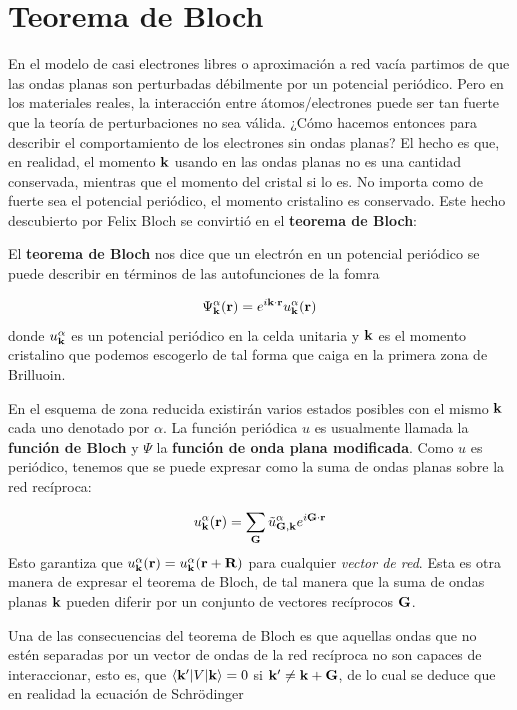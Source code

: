 \section{Teorema de Bloch}

En el modelo de casi electrones libres o aproximación a red vacía partimos de que las ondas planas son perturbadas débilmente por un potencial periódico. Pero en los materiales reales, la interacción entre átomos/electrones puede ser tan fuerte que la teoría de perturbaciones no sea válida. ¿Cómo hacemos entonces para describir el comportamiento de los electrones sin ondas planas? El hecho es que, en realidad, el momento $\mathbf{k}$ usando en las ondas planas no es una cantidad conservada, mientras que el momento del cristal si lo es. No importa como de fuerte sea el potencial periódico, el momento cristalino es conservado. Este hecho descubierto por Felix Bloch se convirtió en el \textbf{teorema de Bloch}:

\begin{mybox}
	El \textbf{teorema de Bloch} nos dice que un electrón en un potencial periódico se puede describir en términos de las autofunciones de la fomra
	
	\begin{equation}
		\Psi_{\mathbf{k}}^\alpha (\mathbf{r}) = e^{i\mathbf{k} \cdot \mathbf{r}} u_{\mathbf{k}}^\alpha (\mathbf{r})
	\end{equation}
	donde $u_{\mathbf{k}}^\alpha$ es un potencial periódico en la celda unitaria y $\mathbf{k}$ es el momento cristalino que podemos escogerlo de tal forma que caiga en la primera zona de Brilluoin.
\end{mybox}
En el esquema de zona reducida existirán varios estados posibles con el mismo $\mathbf{k}$ cada uno denotado por $\alpha$. La función periódica $u$ es usualmente llamada la \textbf{función de Bloch} y $\Psi$ la \textbf{función de onda plana modificada}. Como $u$ es periódico, tenemos que se puede expresar como la suma de ondas planas sobre la red recíproca:

\begin{equation}
	u_{\mathbf{k}}^\alpha (\mathbf{r}) = \sum_{\mathbf{G}} \tilde{u}^{\alpha}_{\mathbf{G},\mathbf{k}} e^{i\mathbf{G} \cdot \mathbf{r}}
\end{equation}
Esto garantiza que $u_{\mathbf{k}}^\alpha (\mathbf{r}) = u_{\mathbf{k}}^{\alpha} (\mathbf{r} + \mathbf{R})$ para cualquier \textit{vector de red}. Esta es otra manera de expresar el teorema de Bloch, de tal manera que la suma de ondas planas $\mathbf{k}$ pueden diferir por un conjunto de vectores recíprocos $\mathbf{G}$.

Una de las consecuencias del teorema de Bloch es que aquellas ondas que no estén separadas por un vector de ondas de la red recíproca no son capaces de interaccionar, esto es, que $\langle \mathbf{k}'|V|\mathbf{k} \rangle=0$ si $\mathbf{k}' \neq \mathbf{k} + \mathbf{G}$, de lo cual se deduce que en realidad la ecuación de Schrödinger 

